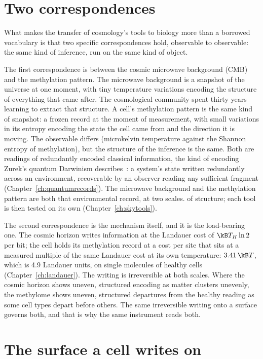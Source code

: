 \section{Two correspondences}\label{sec:ag_two}

What makes the transfer of cosmology's tools to biology more than a borrowed vocabulary is that two specific correspondences hold,
observable to observable: the same kind of inference, run on the same kind of object.

The first correspondence is between the cosmic microwave background (CMB) and the methylation pattern. The microwave background is a
snapshot of the universe at one moment, with tiny temperature variations encoding the structure of everything that came after. The
cosmological community spent thirty years learning to extract that structure. A cell's methylation pattern is the same kind of snapshot:
a frozen record at the moment of measurement, with small variations in its entropy encoding the state the cell came from and the direction
it is moving. The observable differs (microkelvin temperature against the Shannon entropy of methylation), but the structure of the
inference is the same. Both are readings of redundantly encoded classical information, the kind of encoding Zurek's quantum Darwinism
describes~\cite{Zurek2009}: a system's state written redundantly across an environment, recoverable by an observer reading any sufficient
fragment (Chapter~\ref{ch:quantumrecords}). The microwave background and the methylation pattern are both that environmental record, at
two scales. \analogy{} of structure; each tool is then tested on its own (Chapter~\ref{ch:skytools}).

The second correspondence is the mechanism itself, and it is the load-bearing one. The cosmic horizon writes information at the
Landauer cost of $\kB T_H\ln2$ per bit; the cell holds its methylation record at a cost per site that sits at a measured multiple of the
same Landauer cost at its own temperature: $3.41\,\kB T$, which is 4.9 Landauer units, on single molecules of healthy cells
(Chapter~\ref{ch:landauer}). \measured{} The writing is irreversible at both scales. Where the cosmic horizon shows uneven, structured
encoding as matter clusters unevenly, the methylome shows uneven, structured departures from the healthy reading as some cell types
depart before others. The same irreversible writing onto a surface governs both, and that is why the same instrument reads both.
\conjecture

\section{The surface a cell writes on}\label{sec:ag_surface}

